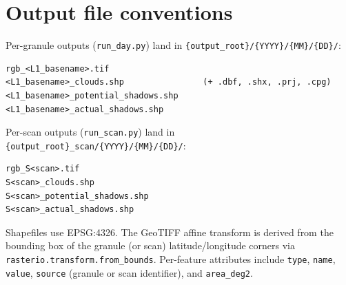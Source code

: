 \documentclass[11pt,a4paper]{article}
\newcommand{\code}[1]{\texttt{#1}}
\begin{document}
\section{Output file conventions}\label{app:outputs}

Per-granule outputs (\code{run\_day.py}) land in
\code{\{output\_root\}/\{YYYY\}/\{MM\}/\{DD\}/}:
\begin{verbatim}
rgb_<L1_basename>.tif
<L1_basename>_clouds.shp                (+ .dbf, .shx, .prj, .cpg)
<L1_basename>_potential_shadows.shp
<L1_basename>_actual_shadows.shp
\end{verbatim}

Per-scan outputs (\code{run\_scan.py}) land in
\code{\{output\_root\}\_scan/\{YYYY\}/\{MM\}/\{DD\}/}:
\begin{verbatim}
rgb_S<scan>.tif
S<scan>_clouds.shp
S<scan>_potential_shadows.shp
S<scan>_actual_shadows.shp
\end{verbatim}

Shapefiles use EPSG:4326. The GeoTIFF affine transform is derived from
the bounding box of the granule (or scan) latitude/longitude corners via
\code{rasterio.transform.from\_bounds}. Per-feature attributes include
\code{type}, \code{name}, \code{value}, \code{source} (granule or scan
identifier), and \code{area\_deg2}.
\end{document}
